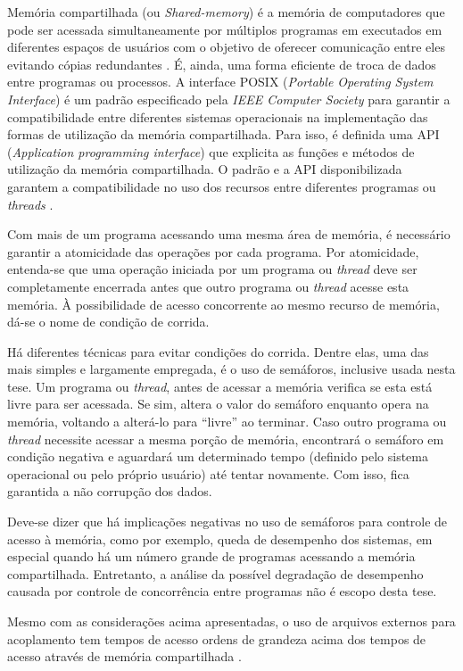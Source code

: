 Memória compartilhada (ou \textit{Shared-memory}) é a memória de computadores que pode ser
acessada simultaneamente por múltiplos programas em executados em diferentes
espaços de usuários com o objetivo de oferecer comunicação entre
eles evitando cópias redundantes \cite{Robbins2003}. É, ainda, uma forma eficiente
de troca de dados entre programas ou processos. A interface POSIX
(\textit{Portable Operating System Interface}) \cite{Walli1995} é um
padrão especificado pela \textit{IEEE Computer Society} para garantir
a compatibilidade entre diferentes sistemas operacionais na implementação
das formas de utilização da memória compartilhada. Para isso, é definida
uma API (\textit{Application programming interface}) que explicita as funções
e métodos de utilização da memória compartilhada. O padrão e a API disponibilizada
garantem a compatibilidade no uso dos recursos entre diferentes programas ou \textit{threads}
\cite{Atlidakis2016}.

Com mais de um programa acessando uma mesma área de memória, é necessário garantir a atomicidade
das operações por cada programa. Por atomicidade, entenda-se que uma operação iniciada por um
programa ou \textit{thread} deve ser completamente encerrada antes que outro programa ou
\textit{thread} acesse esta memória. À possibilidade de acesso concorrente ao mesmo recurso
de memória, dá-se o nome de condição de corrida.

Há diferentes técnicas para evitar condições do corrida. Dentre elas, uma das mais simples e
largamente empregada, é o uso de semáforos, inclusive usada nesta tese.
Um programa ou \textit{thread}, antes de acessar a memória
verifica se esta está livre para ser acessada. Se sim, altera o valor do semáforo enquanto opera na
memória, voltando a alterá-lo para ``livre'' ao terminar. Caso outro programa ou \textit{thread}
necessite acessar a mesma porção de memória, encontrará o semáforo em condição negativa e aguardará
um determinado tempo (definido pelo sistema operacional ou pelo próprio usuário) até tentar novamente.
Com isso, fica garantida a não corrupção dos dados.

Deve-se dizer que há implicações negativas no uso de semáforos para controle de acesso à memória,
como por exemplo, queda de desempenho dos sistemas, em especial quando há um número grande
de programas acessando a memória compartilhada. Entretanto, a análise da possível degradação
de desempenho causada por controle de concorrência entre programas não é escopo desta tese.

Mesmo com as considerações acima apresentadas, o uso de arquivos externos para acoplamento
\cite{Hummel2016} tem tempos de acesso ordens de grandeza acima dos tempos de acesso
através de memória compartilhada \cite{Theler2013}.

